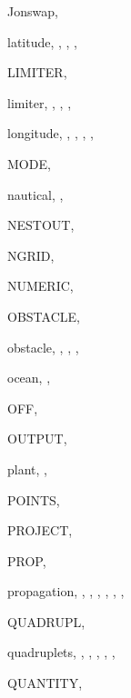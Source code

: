 \documentclass[12pt]{book}
\begin{document}
\begin{theindex}
  \item Jonswap, 

  \indexspace

  \item latitude, , , ,
  \item LIMITER, 
  \item limiter, , , ,
  \item longitude, , , ,
		, 

  \indexspace

  \item MODE, 

  \indexspace

  \item nautical, , 
  \item NESTOUT, 
  \item NGRID, 
  \item NUMERIC, 

  \indexspace

  \item OBSTACLE, 
  \item obstacle, , , ,
  \item ocean, , 
  \item OFF, 
  \item OUTPUT, 

  \indexspace

  \item plant, , 
  \item POINTS, 
  \item PROJECT, 
  \item PROP, 
  \item propagation, , , ,
		, , ,

  \indexspace

  \item QUADRUPL, 
  \item quadruplets, , , ,
		, , 
  \item QUANTITY, 


\end{theindex}
\end{document}
